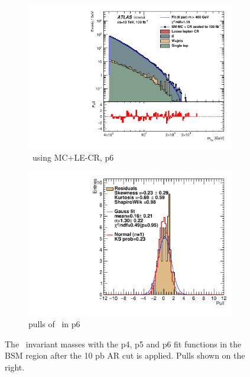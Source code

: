 \begin{figure}[H]
\begin{subfigure}[h]{0.38\linewidth}
    \includegraphics[scale=0.3]{figs/ch6/fit/variable_nosmooth/p6/10PB/output_SMMCplusCR_Mbm_p6.pdf}%
    \caption{\mbmu \ using MC+LE-CR, p6}
    \end{subfigure}
    \hfill
    \begin{subfigure}[h]{0.4\linewidth}
    \includegraphics[scale=0.32]{figs/ch6/fit/variable_nosmooth/p6/10PB/pull_SMMCplusCR_Mbm_p6.pdf}%
    \caption{pulls of \mbmu \ in p6}
    \end{subfigure}
    \hfill
    \caption{The \mbmu \ invariant masses with the p4, p5 and p6 fit functions in the BSM region after the 10 pb AR cut is applied. Pulls shown on the right.}
\label{fig:mbm-fit-pulls}
\end{figure}

\newpage


